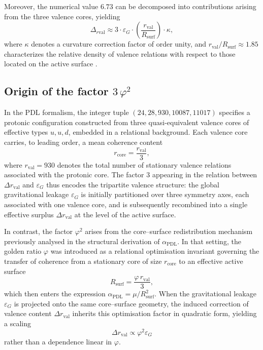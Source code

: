 \documentclass[11pt,a4paper]{article}
\begin{document}
Moreover, the numerical value $6.73$ can be decomposed into contributions arising from the three valence cores, yielding
\begin{equation}
    \Delta_{r\text{val}} \approx 3 \cdot \varepsilon_G \cdot \left( \frac{r_{\text{val}}}{R_{\text{surf}}} \right) \cdot \kappa,
\end{equation}
where $\kappa$ denotes a curvature correction factor of order unity, and $r_{\text{val}}/R_{\text{surf}} \approx 1.85$ characterizes the relative density of valence relations with respect to those located on the active surface \cite{Combinatorial_Proton_v2_2026}.

\subsection*{Origin of the factor \(3\,\varphi^2\)}

In the PDL formalism, the integer tuple \((24, 28, 930, 10087, 11017)\) specifies a protonic configuration constructed from three quasi-equivalent valence cores of effective types \(u, u, d\), embedded in a relational background. Each valence core carries, to leading order, a mean coherence content
\[
r_{\text{core}} = \frac{r_{\text{val}}}{3},
\]
where \(r_{\text{val}} = 930\) denotes the total number of stationary valence relations associated with the protonic core. The factor \(3\) appearing in the relation between \(\Delta r_{\text{val}}\) and \(\varepsilon_G\) thus encodes the tripartite valence structure: the global gravitational leakage \(\varepsilon_G\) is initially partitioned over three symmetry axes, each associated with one valence core, and is subsequently recombined into a single effective surplus \(\Delta r_{\text{val}}\) at the level of the active surface. \cite{Alpha_PDL_2026,Combinatorial_Proton_v2_2026}

In contrast, the factor \(\varphi^2\) arises from the core–surface redistribution mechanism previously analysed in the structural derivation of \(\alpha_{\text{PDL}}\). In that setting, the golden ratio \(\varphi\) was introduced as a relational optimisation invariant governing the transfer of coherence from a stationary core of size \(r_{\text{core}}\) to an effective active surface
\[
R_{\text{surf}} = \frac{\varphi\, r_{\text{val}}}{3},
\]
which then enters the expression \(\alpha_{\text{PDL}} = \mu/R_{\text{surf}}^2\). When the gravitational leakage \(\varepsilon_G\) is projected onto the same core–surface geometry, the induced correction of valence content \(\Delta r_{\text{val}}\) inherits this optimisation factor in quadratic form, yielding a scaling
\[
\Delta r_{\text{val}} \propto \varphi^2 \varepsilon_G
\]
rather than a dependence linear in \(\varphi\). \cite{Golden_Ratio_PDL_2026,Alpha_PDL_2026}
\end{document}
